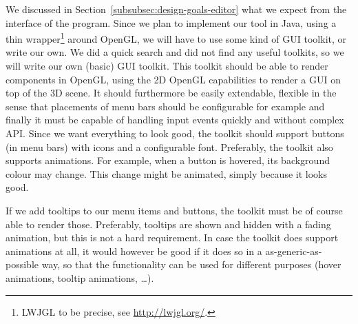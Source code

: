 We discussed in Section~\ref{subsubsec:design-goals-editor} what we expect from the interface of the program. Since we plan to implement our tool in Java, using a thin wrapper\footnote{LWJGL to be precise, see \url{http://lwjgl.org/}.} around OpenGL, we will have to use some kind of GUI toolkit, or write our own. We did a quick search and did not find any useful toolkits, so we will write our own (basic) GUI toolkit. This toolkit should be able to render components in OpenGL, using the 2D OpenGL capabilities to render a GUI on top of the 3D scene. It should furthermore be easily extendable, flexible in the sense that placements of menu bars should be configurable for example and finally it must be capable of handling input events quickly and without complex API. Since we want everything to look good, the toolkit should support buttons (in menu bars) with icons and a configurable font. Preferably, the toolkit also supports animations. For example, when a button is hovered, its background colour may change. This change might be animated, simply because it looks good.

If we add tooltips to our menu items and buttons, the toolkit must be of course able to render those. Preferably, tooltips are shown and hidden with a fading animation, but this is not a hard requirement. In case the toolkit does support animations at all, it would however be good if it does so in a as-generic-as-possible way, so that the functionality can be used for different purposes (hover animations, tooltip animations, \ldots).

